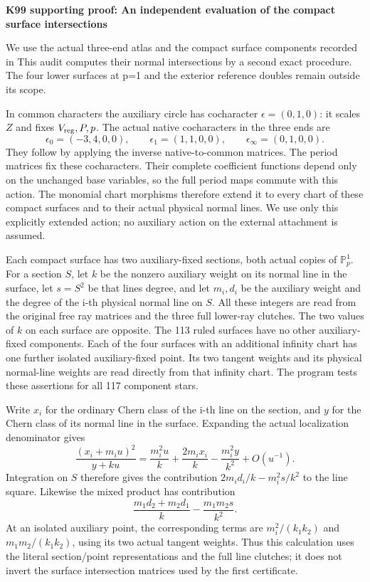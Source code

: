 \par\bigskip\noindent\textbf{K99 supporting proof: An independent evaluation of the compact surface intersections}\par\nobreak
We use the actual three-end atlas and the compact surface components
recorded in  This audit
computes their normal intersections by a second exact procedure. The
four lower surfaces at p=1 and the exterior reference doubles remain
outside its scope.

In common characters the auxiliary circle has cocharacter
\(\epsilon=(0,1,0)\): it scales \(Z\) and fixes
\(V_{\rm reg},P,p\). The actual native cocharacters in the three
ends are
\[
 \epsilon_0=(-3,4,0,0),\qquad
 \epsilon_1=(1,1,0,0),\qquad
 \epsilon_\infty=(0,1,0,0).
\]
They follow by applying the inverse native-to-common matrices. The
period matrices fix these cocharacters. Their complete coefficient
functions depend only on the unchanged base variables, so the full
period maps commute with this action. The monomial chart morphisms
therefore extend it to every chart of these compact surfaces and to
their actual physical normal lines. We use only this explicitly
extended action; no auxiliary action on the external attachment is
assumed.

Each compact surface has two auxiliary-fixed sections, both actual
copies of \(\mathbb P^1_p\). For a section \(S\), let \(k\)
be the nonzero auxiliary weight on its normal line in the surface,
let \(s=S^2\) be that line\textquotesingle s degree, and let \(m_i,d_i\) be
the auxiliary weight and the degree of the i-th physical normal
line on \(S\). All these integers are read from the original
free ray matrices and the three full lower-ray clutches. The two
values of \(k\) on each surface are opposite. The 113 ruled
surfaces have no other auxiliary-fixed components. Each of the four
surfaces with an additional infinity chart has one further isolated
auxiliary-fixed point. Its two tangent weights and its physical
normal-line weights are read directly from that infinity chart.
The program tests these assertions for all 117 component stars.

Write \(x_i\) for the ordinary Chern class of the i-th line on
the section, and \(y\) for the Chern class of its normal line in
the surface. Expanding the actual localization denominator gives
\[
 \frac{(x_i+m_i u)^2}{y+ku}
 =\frac{m_i^2u}{k}+\frac{2m_ix_i}{k}
       -\frac{m_i^2y}{k^2}+O(u^{-1}).
\]
Integration on \(S\) therefore gives the contribution
\(2m_id_i/k-m_i^2s/k^2\) to the line square. Likewise the
mixed product has contribution
\[
 \frac{m_1d_2+m_2d_1}{k}-\frac{m_1m_2s}{k^2}.
\]
At an isolated auxiliary point, the corresponding terms are
\(m_i^2/(k_1k_2)\) and \(m_1m_2/(k_1k_2)\), using its two
actual tangent weights. Thus this calculation uses the literal
section/point representations and the full line clutches; it does
not invert the surface intersection matrices used by the first
certificate.

